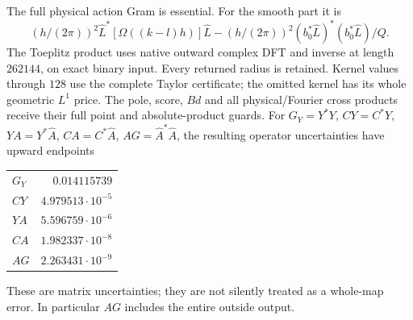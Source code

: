 \documentclass[11pt]{article}
\numberwithin{equation}{section}
\begin{document}
The full physical action Gram is essential. For the smooth part it is
\[
 (h/(2\pi))^2\widehat L^*
       [\Omega((k-l)h)]\widehat L
 - (h/(2\pi))^2(b_0^*\widehat L)^*(b_0^*\widehat L)/Q.
\]
The Toeplitz product uses native outward complex DFT and inverse at
length $262144$, on exact binary input. Every returned radius is
retained. Kernel values through $128$ use the complete Taylor
certificate; the omitted kernel has its whole geometric $L^1$ price.
The pole, score, $Bd$ and all physical/Fourier cross products receive
their full point and absolute-product guards.
For
$G_Y=Y^*Y$, $CY=C^*Y$, $YA=Y^*\widehat A$,
$CA=C^*\widehat A$, $AG=\widehat A^*\widehat A$, the resulting
operator uncertainties have upward endpoints
\begin{center}
\begin{tabular}{lr}
$G_Y$ & $0.014115739$\\
$CY$ & $4.979513\cdot10^{-5}$\\
$YA$ & $5.596759\cdot10^{-6}$\\
$CA$ & $1.982337\cdot10^{-8}$\\
$AG$ & $2.263431\cdot10^{-9}$
\end{tabular}
\end{center}
These are matrix uncertainties; they are not silently treated as a
whole-map error. In particular $AG$ includes the entire outside output.
\end{document}
